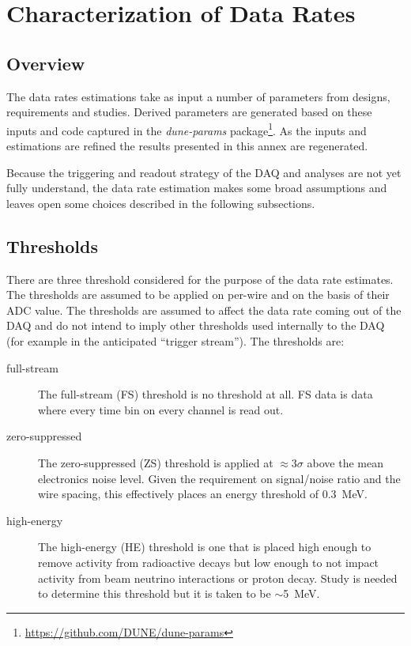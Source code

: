 \chapter{Characterization of Data Rates}
\label{ch:annex-rate}

\section{Overview}

The data rates estimations take as input a number of parameters from
designs, requirements and studies.
Derived parameters are generated based on these inputs and code
captured in the \textit{dune-params} package\footnote{\url{https://github.com/DUNE/dune-params}}.
As the inputs and estimations are refined the results presented in
this annex are regenerated.

Because the triggering and readout strategy of the DAQ and analyses
are not yet fully understand, the data rate estimation makes some
broad assumptions and leaves open some choices described in the
following subsections.



\section{Thresholds}

There are three threshold considered for the purpose of the data rate estimates.
The thresholds are assumed to be applied on per-wire and on the basis
of their ADC value.
The thresholds are assumed to affect the data rate coming out of the
DAQ and do not intend to imply other thresholds used internally to the
DAQ (for example in the anticipated ``trigger stream'').
The thresholds are:

\begin{description}
\item[full-stream] The full-stream (FS) threshold is no threshold at all.
FS data is data where every time bin on every channel is read out.
\item[zero-suppressed] The zero-suppressed (ZS) threshold is applied
  at $\approx 3\sigma$ above the mean electronics noise level.
  Given the requirement on signal/noise ratio and the wire spacing,
  this effectively places an energy threshold of
  \SI{0.3}{\MeV}.
\item[high-energy] The high-energy (HE) threshold is one that is
  placed high enough to remove activity from radioactive decays but
  low enough to not impact activity from beam neutrino interactions or
  proton decay.
  Study is needed to determine this threshold but it is taken to be
  $\sim$\SI{5}{\MeV}.
\end{description}

